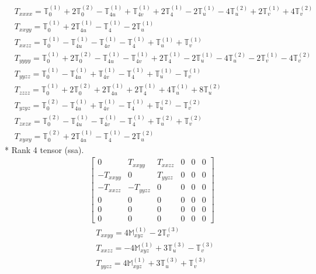 \documentclass[fleqn,8pt,landscape]{jsarticle}
\begin{document}
\begin{align*}
& T_{xxxx} = \mathbb{T}_{0}^{(1)} + 2 \mathbb{T}_{0}^{(2)} - \mathbb{T}_{4u}^{(1)} + \mathbb{T}_{4v}^{(1)} + 2 \mathbb{T}_{4}^{(1)} - 2 \mathbb{T}_{u}^{(1)} - 4 \mathbb{T}_{u}^{(2)} + 2 \mathbb{T}_{v}^{(1)} + 4 \mathbb{T}_{v}^{(2)} \\
& T_{xxyy} = \mathbb{T}_{0}^{(1)} + 2 \mathbb{T}_{4u}^{(1)} - \mathbb{T}_{4}^{(1)} - 2 \mathbb{T}_{u}^{(1)} \\
& T_{xxzz} = \mathbb{T}_{0}^{(1)} - \mathbb{T}_{4u}^{(1)} - \mathbb{T}_{4v}^{(1)} - \mathbb{T}_{4}^{(1)} + \mathbb{T}_{u}^{(1)} + \mathbb{T}_{v}^{(1)} \\
& T_{yyyy} = \mathbb{T}_{0}^{(1)} + 2 \mathbb{T}_{0}^{(2)} - \mathbb{T}_{4u}^{(1)} - \mathbb{T}_{4v}^{(1)} + 2 \mathbb{T}_{4}^{(1)} - 2 \mathbb{T}_{u}^{(1)} - 4 \mathbb{T}_{u}^{(2)} - 2 \mathbb{T}_{v}^{(1)} - 4 \mathbb{T}_{v}^{(2)} \\
& T_{yyzz} = \mathbb{T}_{0}^{(1)} - \mathbb{T}_{4u}^{(1)} + \mathbb{T}_{4v}^{(1)} - \mathbb{T}_{4}^{(1)} + \mathbb{T}_{u}^{(1)} - \mathbb{T}_{v}^{(1)} \\
& T_{zzzz} = \mathbb{T}_{0}^{(1)} + 2 \mathbb{T}_{0}^{(2)} + 2 \mathbb{T}_{4u}^{(1)} + 2 \mathbb{T}_{4}^{(1)} + 4 \mathbb{T}_{u}^{(1)} + 8 \mathbb{T}_{u}^{(2)} \\
& T_{yzyz} = \mathbb{T}_{0}^{(2)} - \mathbb{T}_{4u}^{(1)} + \mathbb{T}_{4v}^{(1)} - \mathbb{T}_{4}^{(1)} + \mathbb{T}_{u}^{(2)} - \mathbb{T}_{v}^{(2)} \\
& T_{zxzx} = \mathbb{T}_{0}^{(2)} - \mathbb{T}_{4u}^{(1)} - \mathbb{T}_{4v}^{(1)} - \mathbb{T}_{4}^{(1)} + \mathbb{T}_{u}^{(2)} + \mathbb{T}_{v}^{(2)} \\
& T_{xyxy} = \mathbb{T}_{0}^{(2)} + 2 \mathbb{T}_{4u}^{(1)} - \mathbb{T}_{4}^{(1)} - 2 \mathbb{T}_{u}^{(2)}
\end{align*}
* Rank 4 tensor (ssa).
\begin{align*}
\begin{bmatrix} 0 & T_{xxyy} & T_{xxzz} & 0 & 0 & 0 \\ - T_{xxyy} & 0 & T_{yyzz} & 0 & 0 & 0 \\ - T_{xxzz} & - T_{yyzz} & 0 & 0 & 0 & 0 \\ 0 & 0 & 0 & 0 & 0 & 0 \\ 0 & 0 & 0 & 0 & 0 & 0 \\ 0 & 0 & 0 & 0 & 0 & 0 \end{bmatrix}
\end{align*}
\begin{align*}
& T_{xxyy} = 4 \mathbb{M}_{xyz}^{(1)} - 2 \mathbb{T}_{v}^{(3)} \\
& T_{xxzz} = - 4 \mathbb{M}_{xyz}^{(1)} + 3 \mathbb{T}_{u}^{(3)} - \mathbb{T}_{v}^{(3)} \\
& T_{yyzz} = 4 \mathbb{M}_{xyz}^{(1)} + 3 \mathbb{T}_{u}^{(3)} + \mathbb{T}_{v}^{(3)}
\end{align*}
\end{document}
